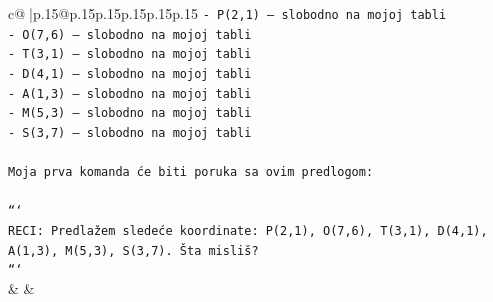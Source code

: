 \documentclass{article}
\begin{document}
{\begin{supertabular}{c@{$\;$}|p{.15\linewidth}@{}p{.15\linewidth}p{.15\linewidth}p{.15\linewidth}p{.15\linewidth}p{.15\linewidth}}
{{{\texttt{{-} P(2,1) – slobodno na mojoj tabli} \\
\texttt{{-} O(7,6) – slobodno na mojoj tabli} \\
\texttt{{-} T(3,1) – slobodno na mojoj tabli} \\
\texttt{{-} D(4,1) – slobodno na mojoj tabli} \\
\texttt{{-} A(1,3) – slobodno na mojoj tabli} \\
\texttt{{-} M(5,3) – slobodno na mojoj tabli} \\
\texttt{{-} S(3,7) – slobodno na mojoj tabli} \\
\\ 
\texttt{Moja prva komanda će biti poruka sa ovim predlogom:} \\
\\ 
\texttt{```} \\
\texttt{RECI: Predlažem sledeće koordinate: P(2,1), O(7,6), T(3,1), D(4,1), A(1,3), M(5,3), S(3,7). Šta misliš?} \\
\texttt{```} \\
            }
        }
    }
    & & \\ \\


\end{supertabular}}
\end{document}
